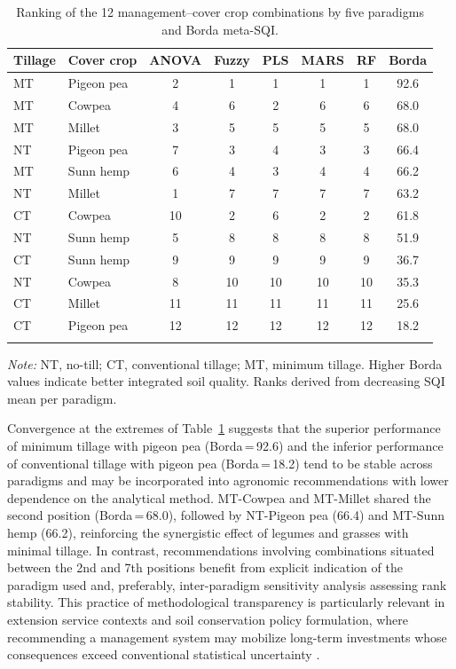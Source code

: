 \documentclass[pdflatex,sn-basic]{sn-jnl}%
\begin{document}
\begin{table}[ht]
\caption{Ranking of the 12 management--cover crop combinations by five paradigms and Borda meta-SQI.}\label{tab:ranking}
\begin{tabular*}{\textwidth}{@{\extracolsep\fill}llcccccc}
\toprule
Tillage & Cover crop & ANOVA & Fuzzy & PLS & MARS & RF & Borda \\
\midrule
MT & Pigeon pea  & 2 & 1 & 1 & 1 & 1 & 92.6 \\
MT & Cowpea      & 4 & 6 & 2 & 6 & 6 & 68.0 \\
MT & Millet      & 3 & 5 & 5 & 5 & 5 & 68.0 \\
NT & Pigeon pea  & 7 & 3 & 4 & 3 & 3 & 66.4 \\
MT & Sunn hemp   & 6 & 4 & 3 & 4 & 4 & 66.2 \\
NT & Millet      & 1 & 7 & 7 & 7 & 7 & 63.2 \\
CT & Cowpea      &10 & 2 & 6 & 2 & 2 & 61.8 \\
NT & Sunn hemp   & 5 & 8 & 8 & 8 & 8 & 51.9 \\
CT & Sunn hemp   & 9 & 9 & 9 & 9 & 9 & 36.7 \\
NT & Cowpea      & 8 &10 &10 &10 &10 & 35.3 \\
CT & Millet      &11 &11 &11 &11 &11 & 25.6 \\
CT & Pigeon pea  &12 &12 &12 &12 &12 & 18.2 \\
\botrule
\end{tabular*}
\smallskip\noindent\textit{Note:} NT, no-till; CT, conventional tillage; MT, minimum tillage. Higher Borda values indicate better integrated soil quality. Ranks derived from decreasing SQI mean per paradigm.
\end{table}

Convergence at the extremes of Table~\ref{tab:ranking} suggests that the superior performance of minimum tillage with pigeon pea (Borda\,=\,92.6) and the inferior performance of conventional tillage with pigeon pea (Borda\,=\,18.2) tend to be stable across paradigms and may be incorporated into agronomic recommendations with lower dependence on the analytical method. MT-Cowpea and MT-Millet shared the second position (Borda\,=\,68.0), followed by NT-Pigeon pea (66.4) and MT-Sunn hemp (66.2), reinforcing the synergistic effect of legumes and grasses with minimal tillage. In contrast, recommendations involving combinations situated between the 2nd and 7th positions benefit from explicit indication of the paradigm used and, preferably, inter-paradigm sensitivity analysis assessing rank stability. This practice of methodological transparency is particularly relevant in extension service contexts and soil conservation policy formulation, where recommending a management system may mobilize long-term investments whose consequences exceed conventional statistical uncertainty \citep{Majid2025}.
\end{document}

